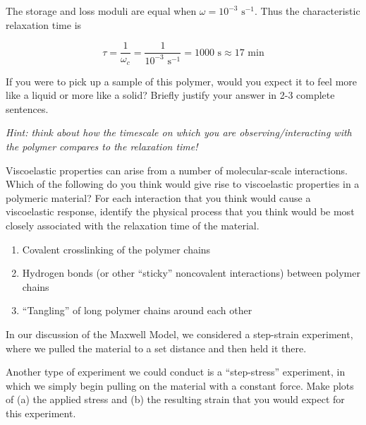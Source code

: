 \begin{activity}
\begin{ctqs}
\begin{solution}[1.5in]
						The storage and loss moduli are equal when $\omega=10^{-3}\text{ s}^{-1}$.  Thus the characteristic relaxation time is
						
						\begin{equation*}
							\tau = \frac{1}{\omega_c} = \frac{1}{10^{-3}\text{ s}^{-1}} = 1000\text{ s} \approx 17\text{ min}
						\end{equation*}
					\end{solution}
	
	\question If you were to pick up a sample of this polymer, would you expect it to feel more like a liquid or more like a solid?  Briefly justify your answer in 2-3 complete sentences.
	
		\emph{Hint: think about how the timescale on which you are observing/interacting with the polymer compares to the relaxation time!}
	
					\begin{solution}[2in]
					\end{solution}
	
\end{ctqs}
	

\begin{exercises}

		\exercise Viscoelastic properties can arise from a number of molecular-scale interactions.  Which of the following do you think would give rise to viscoelastic properties in a polymeric material?  For each interaction that you think would cause a viscoelastic response, identify the physical process that you think would be most closely associated with the relaxation time of the material.
		
			\begin{enumerate}
				\item Covalent crosslinking of the polymer chains
				\item Hydrogen bonds (or other ``sticky'' noncovalent interactions) between polymer chains
				\item ``Tangling'' of long polymer chains around each other
			\end{enumerate}
			
		
		\exercise In our discussion of the Maxwell Model, we considered a step-strain experiment, where we pulled the material to a set distance and then held it there.
		
			Another type of experiment we could conduct is a ``step-stress'' experiment, in which we simply begin pulling on the material with a constant force.  Make plots of (a) the applied stress and (b) the resulting strain that you would expect for this experiment.
			

\end{exercises}
\end{activity}
